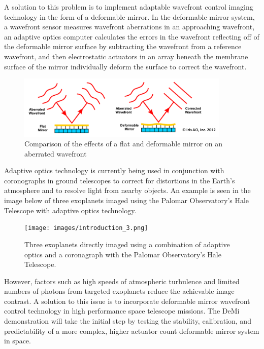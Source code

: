 \documentclass[12pt]{article}
\begin{document}
A solution to this problem is to implement adaptable wavefront control imaging technology in the form of a deformable mirror.  In the deformable mirror system, a wavefront sensor measures wavefront aberrations in an approaching wavefront, an adaptive optics computer calculates the errors in the wavefront reflecting off of the deformable mirror surface by subtracting the wavefront from a reference wavefront, and then electrostatic actuators in an array beneath the membrane surface of the mirror individually deform the surface to correct the wavefront.   

\begin{figure}[!ht]
				\centering
				\includegraphics[width=4in]{images/introduction_2.png}
				\caption{Comparison of the effects of a flat and deformable mirror on an aberrated wavefront}
				\label{fig:Intro_wavefront}
			\end{figure}

Adaptive optics technology is currently being used in conjunction with coronographs in ground telescopes to correct for distortions in the Earth’s atmosphere and to resolve light from nearby objects.  An example is seen in the image below of three exoplanets imaged using the Palomar Observatory’s Hale Telescope with adaptive optics technology.  


\begin{figure}[!ht]
				\centering
				\texttt{[image: images/introduction\_3.png]}
				\caption{Three exoplanets directly imaged using a combination of adaptive optics and a coronagraph with the Palomar Observatory’s Hale Telescope.}
				\label{fig:Intro_exo}
			\end{figure}

However, factors such as high speeds of atmospheric turbulence and limited numbers of photons from targeted exoplanets reduce the achievable image contrast.  A solution to this issue is to incorporate deformable mirror wavefront control technology in high performance space telescope missions.  The DeMi demonstration will take the initial step by testing the stability, calibration, and predictability of a more complex, higher actuator count deformable mirror system in space.   
\end{document}
